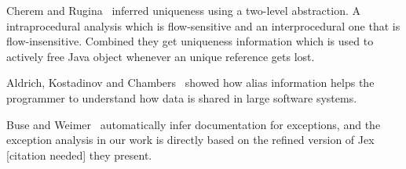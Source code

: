 Cherem and Rugina~\cite{UniquenessInference} inferred uniqueness using a two-level
abstraction. A intraprocedural analysis which is flow-sensitive and an interprocedural
one that is flow-insensitive. Combined they get uniqueness information
which is used to actively free Java object whenever an unique reference gets lost.

Aldrich, Kostadinov and Chambers~\cite{AliasJava} showed how alias information 
helps the programmer to understand how data is shared in large software systems.

Buse and Weimer~\cite{autodoc} automatically infer documentation for
exceptions, and the exception analysis in our work is directly based on the
refined version of {\sc Jex} [citation needed] they present.
